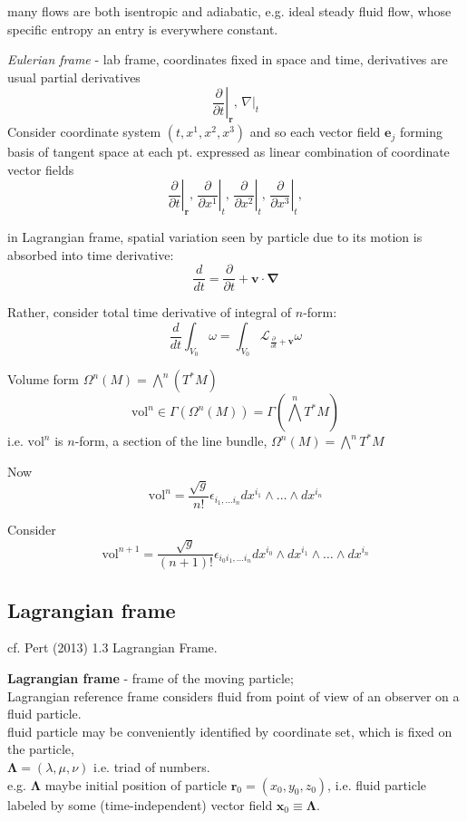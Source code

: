\documentclass[10pt]{amsart}
\begin{document}
\begin{multicols*}{2}
many flows are both isentropic and adiabatic, e.g. ideal steady fluid flow, whose specific entropy an entry is everywhere constant.

\emph{Eulerian frame} - lab frame, coordinates fixed in space and time, derivatives are usual partial derivatives
\[
\left. \frac{ \partial }{ \partial t} \right|_{\mathbf{r}}, \, \left. \nabla \right|_t
\]
Consider coordinate system $(t, x^1, x^2, x^3)$ and so each vector field $\mathbf{e}_j$ forming basis of tangent space at each pt. expressed as linear combination of coordinate vector fields
\[
\left. \frac{\partial}{\partial t} \right|_{\mathbf{r}}, \, \left. \frac{\partial}{\partial x^1} \right|_{t}, \, \left. \frac{\partial}{\partial x^2} \right|_{t}, \, \left. \frac{\partial}{\partial x^3} \right|_{t},
\]

in Lagrangian frame, spatial variation seen by particle due to its motion is absorbed into time derivative:
\[
\frac{d}{dt} = \frac{\partial }{ \partial t} + \mathbf{v} \cdot \mathbf{\nabla} 
\]

Rather, consider total time derivative of integral of $n$-form: 
\[
\frac{d}{dt} \int_{V_0} \omega = \int_{V_0} \mathcal{L}_{\frac{\partial}{\partial t} + \mathbf{v} } \omega 
\]

Volume form $\Omega^n(M) = \bigwedge^n (T^*M)$
\[
\text{vol}^n \in \Gamma(\Omega^n(M)) = \Gamma(\bigwedge^n T^*M)
\]
i.e. $\text{vol}^n$ is $n$-form, a section of the line bundle, $\Omega^n(M) = \bigwedge^n T^*M$

Now
\[
\text{vol}^n = \frac{\sqrt{g}}{ n!} \epsilon_{i_1, \dots i_n} dx^{i_1} \wedge \dots \wedge dx^{i_n}
\]

Consider 
\[
\text{vol}^{n+1} = \frac{\sqrt{g}}{ (n+1)!} \epsilon_{i_0 i_1, \dots i_n} dx^{i_0} \wedge dx^{i_1} \wedge \dots \wedge dx^{i_n}
\]

\subsection{Lagrangian frame}

cf. Pert (2013) \cite{Pert2013} 1.3 Lagrangian Frame.

\textbf{Lagrangian frame} - frame of the moving particle; \\
Lagrangian reference frame considers fluid from point of view of an observer on a fluid particle. \\

fluid particle may be conveniently identified by coordinate set, which is fixed on the particle, \\
$\mathbf{\Lambda} = (\lambda, \mu, \nu)$ i.e. triad of numbers. \\
e.g. $\mathbf{\Lambda}$ maybe initial position of particle $\mathbf{r}_0 = (x_0, y_0, z_0)$, i.e. fluid particle labeled by some (time-independent) vector field $\mathbf{x}_0 \equiv \mathbf{\Lambda}$. \\


\end{multicols*}
\end{document}
